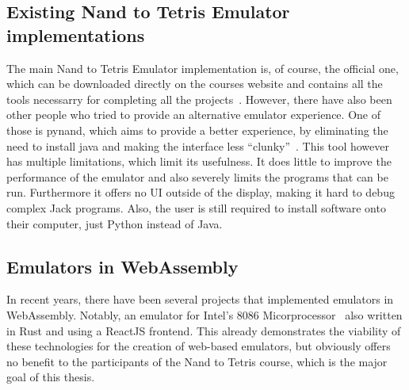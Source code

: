 \subsection{Existing Nand to Tetris Emulator implementations}

The main Nand to Tetris Emulator implementation is, of course, the official one, which can be downloaded directly on the courses website and contains all the tools necessarry for completing all the projects~\cite[Software]{n2tweb}.
However, there have also been other people who tried to provide an alternative emulator experience. One of those is pynand, which aims to provide a better experience, by eliminating the need to install java and making the interface less ``clunky''~\cite{pynand}. This tool however has multiple limitations, which limit its usefulness. It does little to improve the performance of the emulator and also severely limits the programs that can be run. Furthermore it offers no UI outside of the display, making it hard to debug complex Jack programs. Also, the user is still required to install software onto their computer, just Python instead of Java.


\subsection{Emulators in WebAssembly}

In recent years, there have been several projects that implemented emulators in WebAssembly. Notably, an emulator for Intel's 8086 Micorprocessor~\cite{9824078} also written in Rust and using a ReactJS frontend. This already demonstrates the viability of these technologies for the creation of web-based emulators, but obviously offers no benefit to the participants of the Nand to Tetris course, which is the major goal of this thesis.

